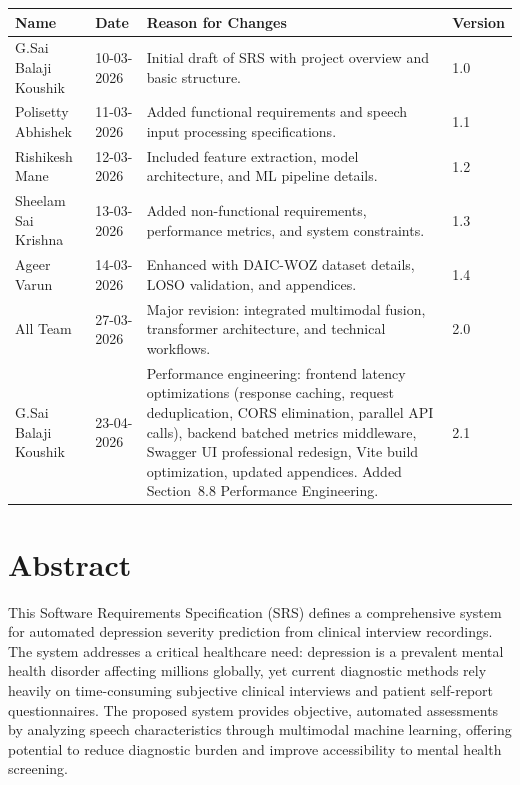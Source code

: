 \documentclass[12pt]{article}
\begin{document}
	\begin{table}[h!]
		\centering
		\begin{tabular}{|l|l|p{6cm}|l|}
			\hline
			\textbf{Name} & \textbf{Date} & \textbf{Reason for Changes} & \textbf{Version} \\
			\hline
			G.Sai Balaji Koushik & 10-03-2026 & Initial draft of SRS with project overview and basic structure. & 1.0 \\ \hline
			Polisetty Abhishek & 11-03-2026 & Added functional requirements and speech input processing specifications. & 1.1 \\ \hline
			Rishikesh Mane & 12-03-2026 & Included feature extraction, model architecture, and ML pipeline details. & 1.2 \\ \hline
			Sheelam Sai Krishna & 13-03-2026 & Added non-functional requirements, performance metrics, and system constraints. & 1.3 \\ \hline
			Ageer Varun & 14-03-2026 & Enhanced with DAIC-WOZ dataset details, LOSO validation, and appendices. & 1.4 \\ \hline
			All Team & 27-03-2026 & Major revision: integrated multimodal fusion, transformer architecture, and technical workflows. & 2.0 \\ \hline
			G.Sai Balaji Koushik & 23-04-2026 & Performance engineering: frontend latency optimizations (response caching, request deduplication, CORS elimination, parallel API calls), backend batched metrics middleware, Swagger UI professional redesign, Vite build optimization, updated appendices. Added Section~8.8 Performance Engineering. & 2.1 \\ \hline
		\end{tabular}
	\end{table}
	\newpage


	\section*{Abstract}

	\noindent
	This Software Requirements Specification (SRS) defines a comprehensive system for automated depression severity prediction from clinical interview recordings. The system addresses a critical healthcare need: depression is a prevalent mental health disorder affecting millions globally, yet current diagnostic methods rely heavily on time-consuming subjective clinical interviews and patient self-report questionnaires. The proposed system provides objective, automated assessments by analyzing speech characteristics through multimodal machine learning, offering potential to reduce diagnostic burden and improve accessibility to mental health screening.
\end{document}
